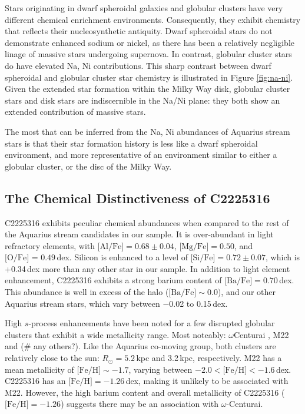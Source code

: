 \documentclass{emulateapj}
\begin{document}
Stars originating in dwarf spheroidal galaxies and globular clusters have very different chemical enrichment environments. Consequently, they exhibit chemistry that reflects their nucleosynthetic antiquity. Dwarf spheroidal stars do not demonstrate enhanced sodium or nickel, as there has been a relatively negligible linage of massive stars undergoing supernova. In contrast, globular cluster stars do have elevated Na, Ni contributions. This sharp contrast between dwarf spheroidal and globular cluster star chemistry is illustrated in Figure \ref{fig:na-ni}. Given the extended star formation within the Milky Way disk, globular cluster stars and disk stars are indiscernible in the Na/Ni plane: they both show an extended contribution of massive stars. 

The most that can be inferred from the Na, Ni abundances of Aquarius stream stars is that their star formation history is less like a dwarf spheroidal environment, and more representative of an environment similar to either a globular cluster, or the disc of the Milky Way. 



\subsection{The Chemical Distinctiveness of C2225316}


C2225316 exhibits peculiar chemical abundances when compared to the rest of the Aquarius stream candidates in our sample. It is over-abundant in light refractory elements, with $\mbox{[Al/Fe]} = 0.68 \pm 0.04$, $\mbox{[Mg/Fe]} = 0.50$, and $\mbox{[O/Fe] = 0.49}$\,dex. Silicon is enhanced to a level of $\mbox{[Si/Fe]} = 0.72 \pm 0.07$, which is +0.34\,dex more than any other star in our sample. In addition to light element enhancement, C2225316 exhibits a strong barium content of $\mbox{[Ba/Fe]} = 0.70$\,dex. This abundance is well in excess of the halo ($\mbox{[Ba/Fe]} \sim 0.0$), and our other Aquarius stream stars, which vary between $-$0.02 to 0.15\,dex. 

High $s$-process enhancements have been noted for a few disrupted globular clusters that exhibit a wide metallicity range. Most noteably: $\omega$Centurai \citep{Majewski;et-al_2012}, M22 \citep{marinolet-al_2011} and (\# any others?). Like the Aquarius co-moving group, both clusters are relatively close to the sun: $R_\odot = 5.2$\,kpc and 3.2\,kpc, respectively. M22 has a mean metallicity of $\mbox{[Fe/H]} \sim -1.7$, varying between $-2.0 < \mbox{[Fe/H]} < -1.6$\,dex. C2225316 has an $\mbox{[Fe/H]} = -1.26$\,dex, making it unlikely to be associated with M22. However, the high barium content and overall metallicity of C2225316 ($\mbox{[Fe/H]} = -1.26$) suggests there may be an association with $\omega$-Centurai.
\end{document}
